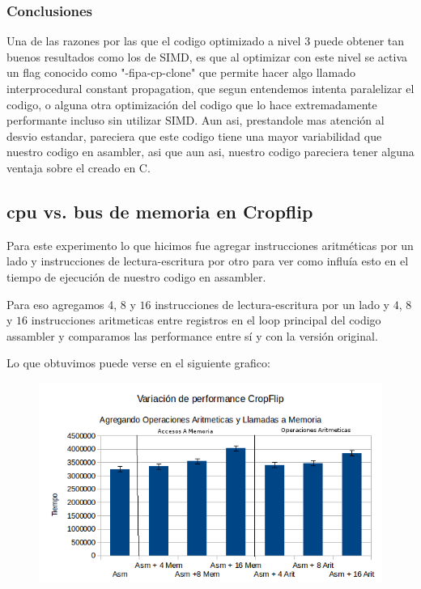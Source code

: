\documentclass[a4paper]{article}
\begin{document}
\subsubsection{Conclusiones}
Una de las razones por las que el codigo optimizado a nivel 3 puede obtener tan buenos resultados como los de SIMD, es que al optimizar con este nivel se activa un flag conocido como "-fipa-cp-clone" que permite hacer algo llamado interprocedural constant propagation, que segun entendemos intenta paralelizar el codigo, o alguna otra optimización del codigo que lo hace extremadamente performante incluso sin utilizar SIMD. Aun asi, prestandole mas atención al desvio estandar, pareciera que este codigo tiene una mayor variabilidad que nuestro codigo en asambler, asi que aun asi, nuestro codigo pareciera tener alguna ventaja sobre el creado en C.

\newpage

\subsection{cpu vs. bus de memoria en Cropflip}

Para este experimento lo que hicimos fue agregar instrucciones aritméticas por un lado y instrucciones de lectura-escritura por otro para ver como influía esto en el tiempo de ejecución de nuestro codigo en assambler.

Para eso agregamos $4$, $8$ y $16$ instrucciones de lectura-escritura por un lado y $4$, $8$ y $16$ instrucciones aritmeticas entre registros en el loop principal del codigo assambler y comparamos las performance entre sí y con la versión original.

Lo que obtuvimos puede verse en el siguiente grafico:

\begin{figure}[h!]
  \begin{center}
  \includegraphics[scale=0.66]{Graficos1.5/crop/per.png}
  \label{nombreparareferenciar1}
  \end{center}
\end{figure}
\end{document}
